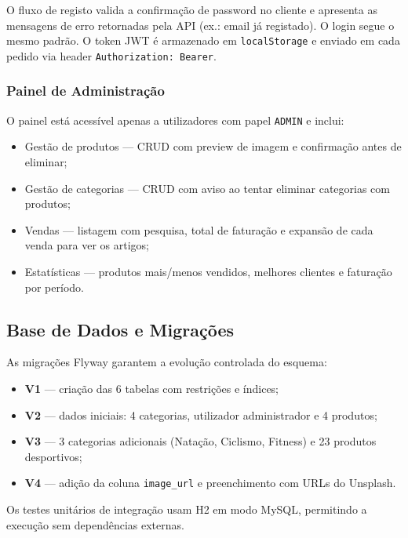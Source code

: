 O fluxo de registo valida a confirmação de password no cliente e apresenta as mensagens de erro retornadas pela API (ex.: email já registado). O login segue o mesmo padrão. O token JWT é armazenado em \texttt{localStorage} e enviado em cada pedido via header \texttt{Authorization: Bearer}.

\subsubsection{Painel de Administração}

O painel está acessível apenas a utilizadores com papel \texttt{ADMIN} e inclui:
\begin{itemize}
    \item Gestão de produtos — CRUD com preview de imagem e confirmação antes de eliminar;
    \item Gestão de categorias — CRUD com aviso ao tentar eliminar categorias com produtos;
    \item Vendas — listagem com pesquisa, total de faturação e expansão de cada venda para ver os artigos;
    \item Estatísticas — produtos mais/menos vendidos, melhores clientes e faturação por período.
\end{itemize}

\subsection{Base de Dados e Migrações}

As migrações Flyway garantem a evolução controlada do esquema:

\begin{itemize}
    \item \textbf{V1} — criação das 6 tabelas com restrições e índices;
    \item \textbf{V2} — dados iniciais: 4 categorias, utilizador administrador e 4 produtos;
    \item \textbf{V3} — 3 categorias adicionais (Natação, Ciclismo, Fitness) e 23 produtos desportivos;
    \item \textbf{V4} — adição da coluna \texttt{image\_url} e preenchimento com URLs do Unsplash.
\end{itemize}

Os testes unitários de integração usam H2 em modo MySQL, permitindo a execução sem dependências externas.
